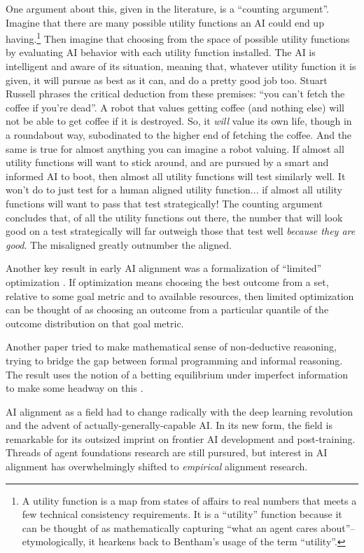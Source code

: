 One argument about this, given in the literature, is a ``counting argument''.
Imagine that there are many possible utility functions an AI could end up
having.\footnote{A utility function is a map from states of affairs to real
numbers that meets a few technical consistency requirements. It is a
``utility'' function because it can be thought of as mathematically capturing
``what an agent cares about''--etymologically, it hearkens back to Bentham's
usage of the term ``utility''.} Then imagine that choosing from the space of
possible utility functions by evaluating AI behavior with each utility function
installed. The AI is intelligent and aware of its situation, meaning that,
whatever utility function it is given, it will pursue as best as it can, and do
a pretty good job too. Stuart Russell \cite{russell2019human} phrases the
critical deduction from these premises: ``you can't fetch the coffee if you're
dead''. A robot that values getting coffee (and nothing else) will not be able
to get coffee if it is destroyed. So, it \emph{will} value its own life, though
in a roundabout way, subodinated to the higher end of fetching the coffee. And
the same is true for almost anything you can imagine a robot valuing. If almost
all utility functions will want to stick around, and are pursued by a smart and
informed AI to boot, then almost all utility functions will test similarly
well. It won't do to just test for a human aligned utility function... if
almost all utility functions will want to pass that test strategically! The
counting argument concludes that, of all the utility functions out there, the
number that will look good on a test strategically will far outweigh those that
test well \emph{because they are good}. The misaligned greatly outnumber the
aligned.

Another key result in early AI alignment was a formalization of ``limited''
optimization \cite{taylor2016quantilizers}. If optimization means choosing the
best outcome from a set, relative to some goal metric and to available
resources, then limited optimization can be thought of as choosing an outcome
from a particular quantile of the outcome distribution on that goal metric.

Another paper tried to make mathematical sense of non-deductive reasoning,
trying to bridge the gap between formal programming and informal reasoning. The
result uses the notion of a betting equilibrium under imperfect information to
make some headway on this \cite{garrabrant2020induction}.

AI alignment as a field had to change radically with the deep learning
revolution and the advent of actually-generally-capable AI. In its new form,
the field is remarkable for its outsized imprint on frontier AI development and
post-training. Threads of agent foundations research are still pursured, but
interest in AI alignment has overwhelmingly shifted to \emph{empirical}
alignment research.

